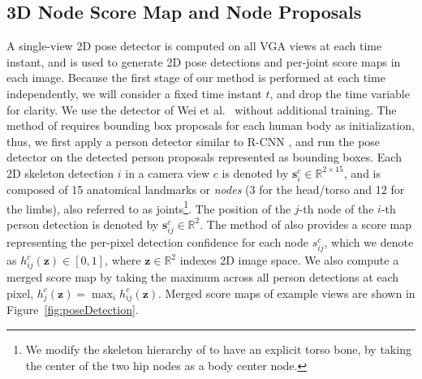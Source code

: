 

\subsection{3D Node Score Map and Node Proposals}
\label{subsection:nodeProposals}
A single-view 2D pose detector is computed on all VGA views at each time instant, and is used to generate 2D pose detections and per-joint score maps in each image. Because the first stage of our method is performed at each time independently, we will consider a fixed time instant $t$, and drop the time variable for clarity. We use the detector of Wei et al.~\cite{Wei2016} without additional training. The method of \cite{Wei2016} requires bounding box proposals for each human body as initialization, thus, we first apply a person detector similar to R-CNN \cite{Girshick-14}, and run the pose detector on the detected person proposals represented as bounding boxes. Each 2D skeleton detection $i$ in a camera view $c$ is denoted by $\mathbf{s}_{i}^c \in \mathds{R}^{2\times 15}$, and is composed of 15 anatomical landmarks or \emph{nodes} (3 for the head/torso and 12 for the limbs), also referred to as joints\footnote{We modify the skeleton hierarchy of \cite{Wei2016} to have an explicit torso bone, by taking the center of the two hip nodes as a body center node.}. The position of the $j$-th node of the $i$-th person detection is denoted by $\mathbf{s}_{ij}^c \in \mathds{R}^{2}$. The method of \cite{Wei2016} also provides a score map representing the per-pixel detection confidence for each node $s_{ij}^c$, which we denote as $h_{ij}^{c}(\mathbf{z})\in[0,1]$, where $\mathbf{z}\in \mathds{R}^2$ indexes 2D image space. We also compute a merged score map by taking the maximum across all person detections at each pixel, $h_{j}^{c}(\mathbf{z})=\max_i h_{ij}^{c}(\mathbf{z})$. Merged score maps of example views are shown in Figure~\ref{fig:poseDetection}.


